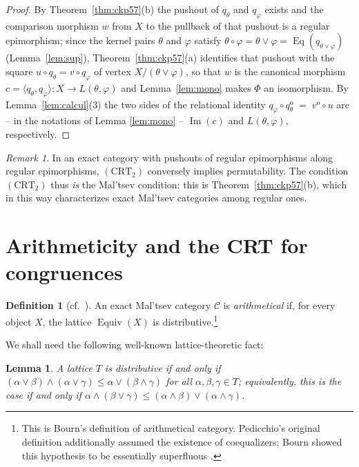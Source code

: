 \documentclass[11pt,a4paper]{article}
\theoremstyle{plain}
\newtheorem{lemme}[theoreme]{Lemma}
\theoremstyle{definition}
\newtheorem{definition}[theoreme]{Definition}
\theoremstyle{remark}
\newtheorem{remarque}[theoreme]{Remark}
\theoremstyle{plain}
\newcommand{\C}{\mathcal{C}}
\newcommand{\Equiv}{\operatorname{Equiv}}
\newcommand{\Eq}{\operatorname{Eq}}
\newcommand{\im}{\operatorname{Im}}
\newcommand{\op}{\mathrm{o}}
\begin{document}
\begin{proof}
By Theorem~\ref{thm:ckp57}(b) the pushout of $q_\theta$ and $q_\varphi$
exists and the comparison morphism $w$ from $X$ to the pullback of that
pushout is a regular epimorphism; since the kernel pairs $\theta$ and
$\varphi$ satisfy $\theta \circ \varphi = \theta \vee \varphi
= \Eq(q_{\theta\vee\varphi})$ (Lemma~\ref{lem:sup}),
Theorem~\ref{thm:ckp57}(a) identifies that pushout with the square
$u \circ q_\theta = v \circ q_\varphi$ of vertex $X/(\theta\vee\varphi)$,
so that $w$ is the canonical morphism
$c = \langle q_\theta, q_\varphi \rangle \colon X \to L(\theta,\varphi)$
and Lemma~\ref{lem:mono} makes $\Phi$ an isomorphism. By
Lemma~\ref{lem:calcul}(3) the two sides of the relational identity $q_\varphi \circ q_\theta^{\op}
\;=\; v^{\op} \circ u$
are -- in the notations of Lemma \ref{lem:mono} --
$\im (c)$ and $L(\theta,\varphi)$, respectively.
\end{proof}


\begin{remarque}\label{rem:reciproque}
In an exact category with pushouts of regular epimorphisms along regular
epimorphisms,
$(\mathrm{CRT}_2)$ conversely implies permutability. The condition $(\mathrm{CRT}_2)$ thus \emph{is} the Mal'tsev
condition: this is Theorem~\ref{thm:ckp57}(b), which in this way
characterizes exact Mal'tsev categories among regular ones. \end{remarque}


\section{Arithmeticity and the CRT for congruences}

\begin{definition}[{cf.\ \cite[Def.~3.12]{Bourn}}]\label{def:arith}
An exact Mal'tsev category $\C$ is \emph{arithmetical} if, for every object
$X$, the lattice $\Equiv(X)$ is distributive.\footnote{This is Bourn's
definition \cite[Def.~3.12]{Bourn} of arithmetical category. Pedicchio's
original definition \cite{Pedicchio} additionally assumed the existence of
coequalizers; Bourn showed this hypothesis to be essentially superfluous
\cite[Thm~3.11]{Bourn}.}
\end{definition}

We shall need the following well-known lattice-theoretic fact:

\begin{lemme}\label{lem:treillis}
 A lattice $T$ is distributive 
 if and only if $(\alpha \vee \beta) \wedge (\alpha \vee \gamma) \le \alpha
\vee (\beta \wedge \gamma)$ for all $\alpha, \beta, \gamma \in T$; equivalently, this is the case if and only if 
$\alpha \wedge (\beta \vee \gamma) \le (\alpha \wedge \beta) \vee (\alpha
\wedge \gamma)$.
\end{lemme}
\end{document}
